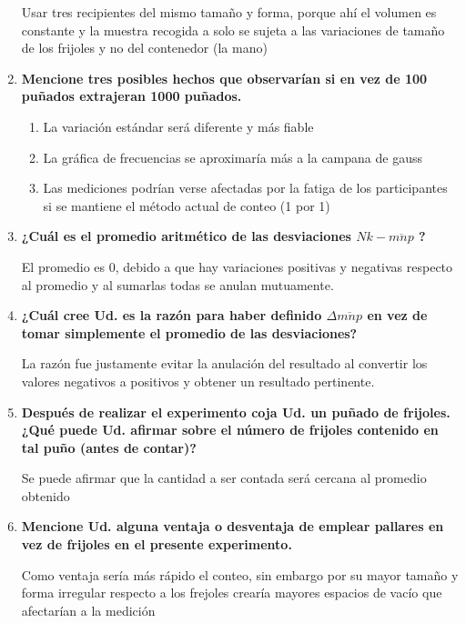 \begin{enumerate}
    Usar tres recipientes del mismo tamaño y forma, porque ahí el volumen es constante y la muestra recogida a solo se sujeta a las variaciones de tamaño de los frijoles y no del contenedor (la mano)
    \item \textbf{Mencione tres posibles hechos que observarían si en vez de 100 puñados
extrajeran 1000 puñados.} 

\begin{enumerate}
    \item  La variación estándar será diferente y más fiable
    \item La gráfica de frecuencias se aproximaría más a la campana de gauss
    \item Las mediciones podrían verse afectadas por la fatiga de los participantes si se mantiene el método actual de conteo (1 por 1)
\end{enumerate}
    \item \textbf{¿Cuál es el promedio aritmético de las desviaciones $Nk - \overline{mnp}$ ?}

    El promedio es 0, debido a que hay variaciones positivas y negativas respecto al promedio y al sumarlas todas se anulan mutuamente.
    \item \textbf{¿Cuál cree Ud. es la razón para haber definido $\Delta \overline{mnp}$ en vez de tomar
simplemente el promedio de las desviaciones?}

    La razón fue justamente evitar la anulación del resultado al convertir los valores negativos a positivos y obtener un resultado pertinente.
    \item \textbf{Después de realizar el experimento coja Ud. un puñado de frijoles. ¿Qué puede
Ud. afirmar sobre el número de frijoles contenido en tal puño (antes de contar)?} 

    Se puede afirmar que la cantidad a ser contada será cercana al promedio obtenido
    \item \textbf{Mencione Ud. alguna ventaja o desventaja de emplear pallares en vez de
frijoles en el presente experimento.}

    Como ventaja sería más rápido el conteo, sin embargo por su mayor tamaño y forma irregular respecto a los frejoles crearía mayores espacios de vacío que afectarían a la medición
\end{enumerate}

\cite{IEEEreferencias:Ref2}